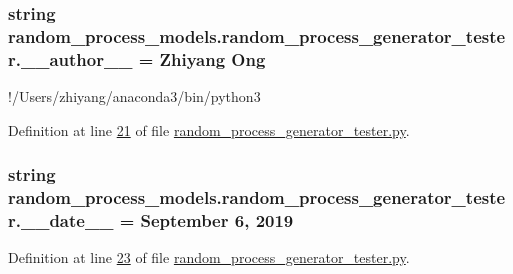 \subsubsection[{\+\_\+\+\_\+author\+\_\+\+\_\+}]{\setlength{\rightskip}{0pt plus 5cm}string random\+\_\+process\+\_\+models.\+random\+\_\+process\+\_\+generator\+\_\+tester.\+\_\+\+\_\+author\+\_\+\+\_\+ = \textquotesingle{}Zhiyang Ong\textquotesingle{}}\label{namespacerandom__process__models_1_1random__process__generator__tester_a533d9611b280d2c9d3154e7ddea602f0}


!/\+Users/zhiyang/anaconda3/bin/python3 



Definition at line \hyperlink{random__process__generator__tester_8py_source_l00021}{21} of file \hyperlink{random__process__generator__tester_8py_source}{random\+\_\+process\+\_\+generator\+\_\+tester.\+py}.

\hypertarget{namespacerandom__process__models_1_1random__process__generator__tester_a0535cc1b4a76908d454a4480982fd703}{}
\subsubsection[{\+\_\+\+\_\+date\+\_\+\+\_\+}]{\setlength{\rightskip}{0pt plus 5cm}string random\+\_\+process\+\_\+models.\+random\+\_\+process\+\_\+generator\+\_\+tester.\+\_\+\+\_\+date\+\_\+\+\_\+ = \textquotesingle{}September 6, 2019\textquotesingle{}}\label{namespacerandom__process__models_1_1random__process__generator__tester_a0535cc1b4a76908d454a4480982fd703}


Definition at line \hyperlink{random__process__generator__tester_8py_source_l00023}{23} of file \hyperlink{random__process__generator__tester_8py_source}{random\+\_\+process\+\_\+generator\+\_\+tester.\+py}.

\hypertarget{namespacerandom__process__models_1_1random__process__generator__tester_a6d64c35578abb54108b6261a9a668bbe}{}
